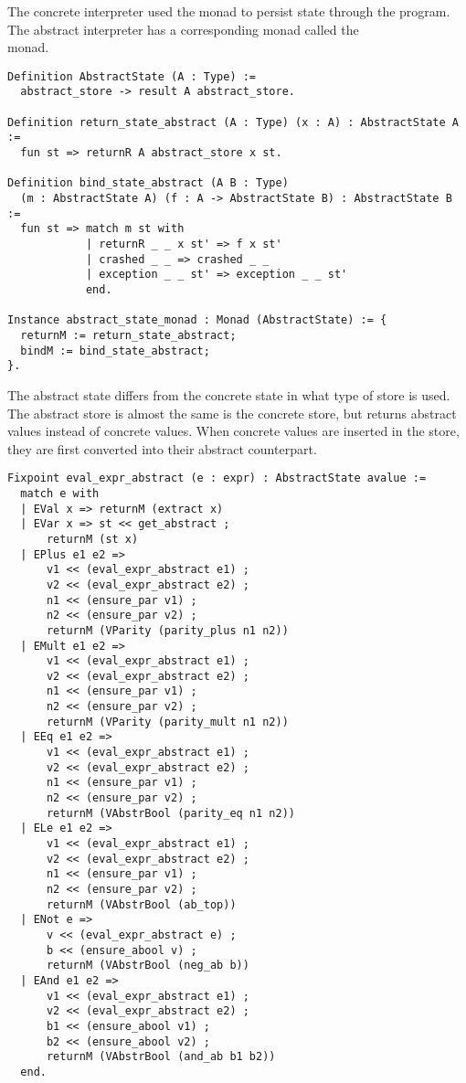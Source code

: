 The concrete interpreter used the  monad to persist state through
the program. The abstract interpreter has a corresponding monad called the \\
 monad.

\begin{verbatim}
Definition AbstractState (A : Type) :=
  abstract_store -> result A abstract_store.

Definition return_state_abstract (A : Type) (x : A) : AbstractState A :=
  fun st => returnR A abstract_store x st.

Definition bind_state_abstract (A B : Type) 
  (m : AbstractState A) (f : A -> AbstractState B) : AbstractState B :=
  fun st => match m st with
            | returnR _ _ x st' => f x st'
            | crashed _ _ => crashed _ _
            | exception _ _ st' => exception _ _ st' 
            end.

Instance abstract_state_monad : Monad (AbstractState) := {
  returnM := return_state_abstract;
  bindM := bind_state_abstract;
}.
\end{verbatim}

The abstract state differs from the concrete state in what type of store is
used. The abstract store is almost the same is the concrete store, but returns
abstract values instead of concrete values. When concrete values are inserted
in the store, they are first converted into their abstract counterpart.

\begin{verbatim}
Fixpoint eval_expr_abstract (e : expr) : AbstractState avalue :=
  match e with
  | EVal x => returnM (extract x)
  | EVar x => st << get_abstract ;
      returnM (st x)
  | EPlus e1 e2 => 
      v1 << (eval_expr_abstract e1) ;
      v2 << (eval_expr_abstract e2) ;
      n1 << (ensure_par v1) ;
      n2 << (ensure_par v2) ;
      returnM (VParity (parity_plus n1 n2))
  | EMult e1 e2 =>
      v1 << (eval_expr_abstract e1) ;
      v2 << (eval_expr_abstract e2) ;
      n1 << (ensure_par v1) ;
      n2 << (ensure_par v2) ;
      returnM (VParity (parity_mult n1 n2))
  | EEq e1 e2 =>
      v1 << (eval_expr_abstract e1) ;
      v2 << (eval_expr_abstract e2) ;
      n1 << (ensure_par v1) ;
      n2 << (ensure_par v2) ;
      returnM (VAbstrBool (parity_eq n1 n2))
  | ELe e1 e2 =>
      v1 << (eval_expr_abstract e1) ;
      v2 << (eval_expr_abstract e2) ;
      n1 << (ensure_par v1) ;
      n2 << (ensure_par v2) ;
      returnM (VAbstrBool (ab_top))
  | ENot e =>
      v << (eval_expr_abstract e) ;
      b << (ensure_abool v) ;
      returnM (VAbstrBool (neg_ab b))
  | EAnd e1 e2 =>
      v1 << (eval_expr_abstract e1) ;
      v2 << (eval_expr_abstract e2) ;
      b1 << (ensure_abool v1) ;
      b2 << (ensure_abool v2) ;
      returnM (VAbstrBool (and_ab b1 b2))
  end.
\end{verbatim}

